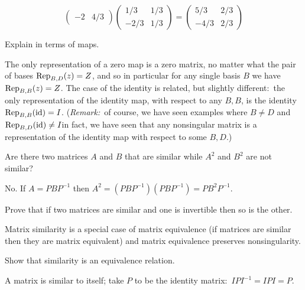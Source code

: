 \begin{exercises}
\begin{answer}
\begin{equation*}
\begin{pmatrix}
           -2  &4/3
         \end{pmatrix}
         \begin{pmatrix}
           1/3 &1/3 \\
          -2/3 &1/3
         \end{pmatrix}
         =
         \begin{pmatrix}
           5/3 &2/3 \\
          -4/3 &2/3
         \end{pmatrix}
      \end{equation*}  
    \end{answer}
  \item 
    Explain  in terms of maps.
    \begin{answer}
      The only representation of a zero map is a zero matrix,
      no matter what the pair of bases $\rep{z}{B,D}=Z$,
      and so in particular for any single basis $B$ we have $\rep{z}{B,B}=Z$.  
      The case of the identity is related, but slightly different:~the 
      only representation of the identity map, with respect to any $B,B$, 
      is the identity $\rep{\identity}{B,B}=I$.
      (\textit{Remark:}~of course, we have seen examples where $B\neq D$ and 
      $\rep{\identity}{B,D}\neq I$\Dash in fact, we have seen that any 
      nonsingular matrix is a representation of the identity map with
      respect to some $B,D$.)
    \end{answer}
  \recommended \item 
    Are there two matrices \( A \) and \( B \) that are
    similar while \( A^2 \) and \( B^2 \) are not similar?
    \cite{Halmos}
    \begin{answer}
      No.
      If \( A=PBP^{-1} \) then \( A^2=(PBP^{-1})(PBP^{-1})=PB^2P^{-1} \).
    \end{answer}
  \recommended \item
    Prove that if two matrices are similar and one is invertible then
    so is the other.
    \begin{answer}
       Matrix similarity is a special case of matrix equivalence 
       (if matrices are similar then they are matrix equivalent)
       and matrix equivalence preserves nonsingularity.
    \end{answer}
  \recommended \item \label{exer:SimIsEquivRel}
    Show that similarity is an equivalence relation.
    \begin{answer}
       A matrix is similar to itself; take \( P \) to be the identity
       matrix:~$IPI^{-1}=IPI=P$.


\end{answer}
\end{exercises}
